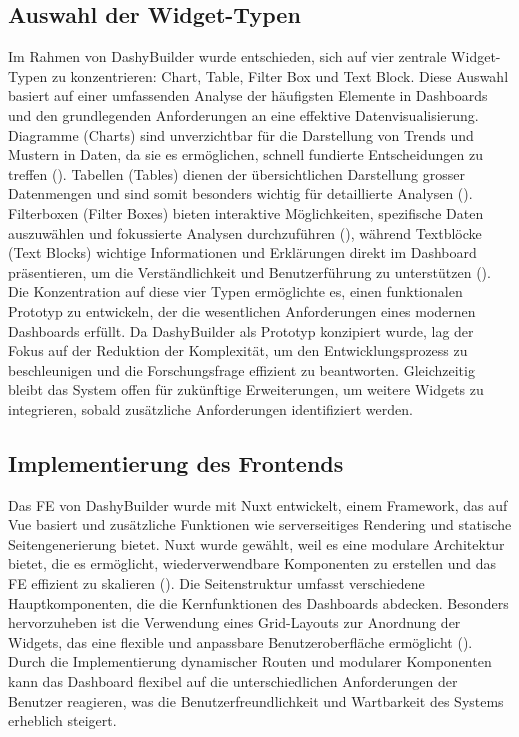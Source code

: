 \documentclass[a4paper, 12pt]{scrartcl}
\begin{document}
\subsection{Auswahl der Widget-Typen}
Im Rahmen von DashyBuilder wurde entschieden, sich auf vier zentrale Widget-Typen zu konzentrieren: Chart, Table, Filter Box und Text Block. Diese Auswahl basiert auf einer umfassenden Analyse der häufigsten Elemente in Dashboards und den grundlegenden Anforderungen an eine effektive Datenvisualisierung. Diagramme (Charts) sind unverzichtbar für die Darstellung von Trends und Mustern in Daten, da sie es ermöglichen, schnell fundierte Entscheidungen zu treffen (\cite{Wang2008}). Tabellen (Tables) dienen der übersichtlichen Darstellung grosser Datenmengen und sind somit besonders wichtig für detaillierte Analysen (\cite{Smailovic2012}). Filterboxen (Filter Boxes) bieten interaktive Möglichkeiten, spezifische Daten auszuwählen und fokussierte Analysen durchzuführen (\cite{Al-Zokari2020AN}), während Textblöcke (Text Blocks) wichtige Informationen und Erklärungen direkt im Dashboard präsentieren, um die Verständlichkeit und Benutzerführung zu unterstützen (\cite{Latif2022}). Die Konzentration auf diese vier Typen ermöglichte es, einen funktionalen Prototyp zu entwickeln, der die wesentlichen Anforderungen eines modernen Dashboards erfüllt. Da DashyBuilder als Prototyp konzipiert wurde, lag der Fokus auf der Reduktion der Komplexität, um den Entwicklungsprozess zu beschleunigen und die Forschungsfrage effizient zu beantworten. Gleichzeitig bleibt das System offen für zukünftige Erweiterungen, um weitere Widgets zu integrieren, sobald zusätzliche Anforderungen identifiziert werden.

\subsection{Implementierung des Frontends}
Das \ac{FE} von DashyBuilder wurde mit \ac{Nuxt} entwickelt, einem Framework, das auf \ac{Vue} basiert und zusätzliche Funktionen wie serverseitiges Rendering und statische Seitengenerierung bietet. \ac{Nuxt} wurde gewählt, weil es eine modulare Architektur bietet, die es ermöglicht, wiederverwendbare Komponenten zu erstellen und das \ac{FE} effizient zu skalieren (\cite{Alasaad2022}). Die Seitenstruktur umfasst verschiedene Hauptkomponenten, die die Kernfunktionen des Dashboards abdecken. Besonders hervorzuheben ist die Verwendung eines Grid-Layouts zur Anordnung der Widgets, das eine flexible und anpassbare Benutzeroberfläche ermöglicht (\cite{Freeman2019}). Durch die Implementierung dynamischer Routen und modularer Komponenten kann das Dashboard flexibel auf die unterschiedlichen Anforderungen der Benutzer reagieren, was die Benutzerfreundlichkeit und Wartbarkeit des Systems erheblich steigert.
\end{document}
